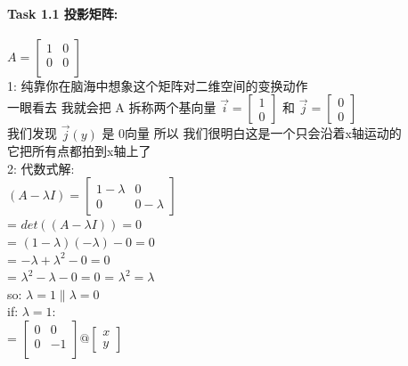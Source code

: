 \documentclass[12pt]{article}
\begin{document}
\paragraph{Task 1.1 投影矩阵:}
\begin{flushleft}
    $A = \begin{bmatrix}
            1 & 0 \\
            0 & 0 \\
        \end{bmatrix}$ \\
    1: 纯靠你在脑海中想象这个矩阵对二维空间的变换动作 \\
    一眼看去 我就会把 A 拆称两个基向量 $\vec{i} = \begin{bmatrix}
            1 \\
            0
        \end{bmatrix}$ 和 $\vec{j} = \begin{bmatrix}
            0 \\
            0
        \end{bmatrix}$ \\
    我们发现 $\vec{j}(y)$ 是 0向量 所以 我们很明白这是一个只会沿着x轴运动的\\
    它把所有点都拍到x轴上了 \\
    2: 代数式解: \\
    $(A - \lambda I) =  \begin{bmatrix}
            1 - \lambda & 0           \\
            0           & 0 - \lambda
        \end{bmatrix}$   \\
    = $det((A - \lambda I)) = 0$ \\
    = $(1 - \lambda)(-\lambda) - 0  = 0$ \\
    = $-\lambda + \lambda^{2} - 0 = 0$ \\
    = $\lambda^{2} - \lambda - 0 = 0 $
    = $\lambda^{2} = \lambda$ \\
    so: $\lambda = 1  \| \lambda = 0$ \\
    if: $\lambda = 1$: \\
    = $\begin{bmatrix}
            0 & 0  \\
            0 & -1 \\
        \end{bmatrix} @ \begin{bmatrix}
            x \\
            y
        \end{bmatrix}$ \\

\end{flushleft}
\end{document}
